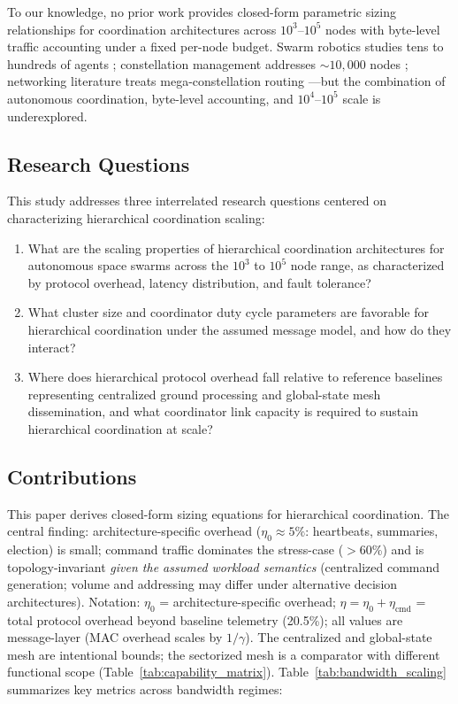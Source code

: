 \documentclass[journal]{IEEEtran}
\begin{document}
To our knowledge, no prior work provides closed-form parametric sizing relationships for coordination architectures across $10^3$--$10^5$ nodes with byte-level traffic accounting under a fixed per-node budget. Swarm robotics studies tens to hundreds of agents \cite{reynolds_1987, brambilla_2013}; constellation management addresses ${\sim}10{,}000$ nodes \cite{wertz_smad}; networking literature treats mega-constellation routing \cite{handley_2018, del_portillo_mega, akyildiz_isl}---but the combination of autonomous coordination, byte-level accounting, and $10^4$--$10^5$ scale is underexplored.

\subsection{Research Questions}

This study addresses three interrelated research questions centered on characterizing hierarchical coordination scaling:

\begin{enumerate}
    \item[\textbf{RQ1:}] What are the scaling properties of hierarchical coordination architectures for autonomous space swarms across the $10^3$ to $10^5$ node range, as characterized by protocol overhead, latency distribution, and fault tolerance?
    \item[\textbf{RQ2:}] What cluster size and coordinator duty cycle parameters are favorable for hierarchical coordination under the assumed message model, and how do they interact?
    \item[\textbf{RQ3:}] Where does hierarchical protocol overhead fall relative to reference baselines representing centralized ground processing and global-state mesh dissemination, and what coordinator link capacity is required to sustain hierarchical coordination at scale?
\end{enumerate}

\subsection{Contributions}

This paper derives closed-form sizing equations for hierarchical coordination. The central finding: architecture-specific overhead ($\eta_0 \approx 5\%$: heartbeats, summaries, election) is small; command traffic dominates the stress-case ($>$60\%) and is topology-invariant \emph{given the assumed workload semantics} (centralized command generation; volume and addressing may differ under alternative decision architectures). Notation: $\eta_0$ = architecture-specific overhead; $\eta = \eta_0 + \eta_{\text{cmd}}$ = total protocol overhead beyond baseline telemetry (20.5\%); all values are message-layer (MAC overhead scales by $1/\gamma$). The centralized and global-state mesh are intentional bounds; the sectorized mesh is a comparator with different functional scope (Table~\ref{tab:capability_matrix}). Table~\ref{tab:bandwidth_scaling} summarizes key metrics across bandwidth regimes:
\end{document}
